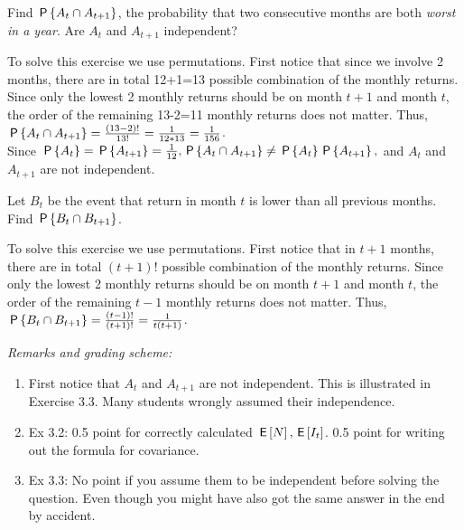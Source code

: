 \begin{exercise}[1.5]
Find $\P{A_t \cap A_{t+1}}$, the probability that two consecutive months are both \textit{worst in a year}. Are $A_t$ and $A_{t+1}$ independent?
\begin{solution}
  To solve this exercise we use permutations. First notice that since we involve 2 months, there are in total 12+1=13 possible combination of the  monthly returns. Since only the lowest 2 monthly returns should be on month $t+1$ and month $t$, the order of the remaining 13-2=11 monthly returns does not matter. Thus, $ \P{A_t \cap A_{t+1}}=\frac{(13-2)!}{13!}=\frac{1}{12*13}=\frac{1}{156}$.\\
    Since $\P{A_t}=\P{A_{t+1}}=\frac{1}{12}, \P{A_t \cap A_{t+1}}\neq \P{A_t}\P{A_{t+1}},$ and $A_t$ and $A_{t+1}$ are not independent.
\end{solution}
\end{exercise}


\begin{exercise}[1]
Let $B_t$ be the event that return in month $t$ is lower than all previous months. Find $\P{B_t \cap B_{t+1}}$.
\begin{solution}
 To solve this exercise we use permutations. First notice that in $t+1$ months, there are in total $(t+1)!$ possible combination of the  monthly returns. Since only the lowest 2 monthly returns should be on month $t+1$ and month $t$, the order of the remaining $t-1$ monthly returns does not matter. Thus, $ \P{B_t \cap B_{t+1}}=\frac{(t-1)!}{(t+1)!}=\frac{1}{t(t+1)}$. 
\end{solution}
\end{exercise}

\noindent \textit{Remarks and grading scheme:}
\begin{enumerate}
    \item First notice that  $A_t$ and $A_{t+1}$ are not independent. This is illustrated in Exercise 3.3. Many students wrongly assumed their independence. 
    \item Ex 3.2: 0.5 point for correctly calculated $\E{N}, \E{I_t}$. 0.5 point for writing out the formula for covariance. 
    \item Ex 3.3: No point if you assume them to be independent before solving the question. Even though you might have also got the same answer in the end by accident.
\end{enumerate}
